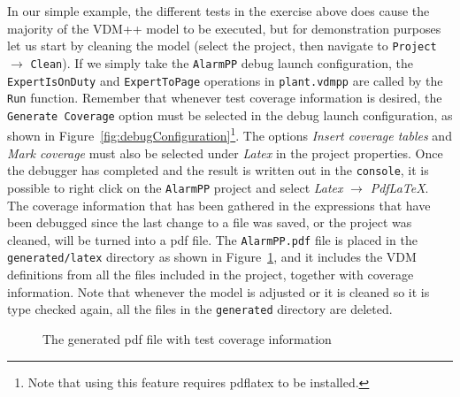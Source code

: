 In our simple example, the different tests in the exercise above does cause the majority of the VDM++ model to be executed, but for demonstration purposes let us start by cleaning the model (select the project, then navigate to \texttt{Project} $\rightarrow$ \texttt{Clean}). If we simply take the \texttt{AlarmPP} debug launch configuration, the \verb|ExpertIsOnDuty| and \verb|ExpertToPage| operations in \verb|plant.vdmpp| are called by the \texttt{Run} function. Remember that whenever test coverage information is desired, the \texttt{Generate Coverage} option must be selected in the debug launch configuration, as shown in Figure~\ref{fig:debugConfiguration}\footnote{Note that using this feature requires pdflatex to be installed.}.  The options \emph{Insert coverage tables} and \emph{Mark coverage} must also be selected under \emph{Latex} in the project properties.  Once the debugger has completed and the result is written out in the \texttt{console}, it is possible to right click on the \texttt{AlarmPP} project and select \emph{Latex} $ \rightarrow $ \emph{PdfLaTeX}. The coverage information that has been gathered in the expressions that have been debugged since the last change to a file was saved, or the project was cleaned, will be turned into a pdf file. The \texttt{AlarmPP.pdf} file is placed in the \texttt{generated/latex} directory as shown in Figure~\ref{fig:testcov}, and it includes the
VDM definitions from all the files included in the project, together with coverage information. Note that whenever the model is adjusted or it is cleaned so it is type checked again, all the files in the \texttt{generated} directory are deleted.
%
\begin{figure}[tb]
\begin{center}
\end{center}
\caption{The generated pdf file with test coverage information\label{fig:testcov}}
\end{figure}

